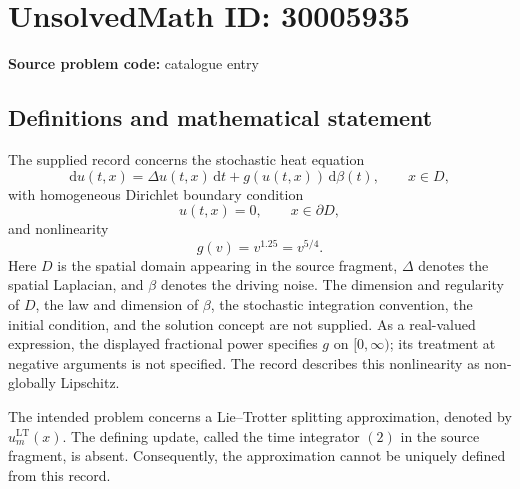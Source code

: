 \documentclass[11pt]{article}
\begin{document}
\section*{UnsolvedMath ID: 30005935}
\textbf{Source problem code:} catalogue entry
\subsection{Definitions and mathematical statement}
The supplied record concerns the stochastic heat equation
\[
\mathrm{d}u(t,x)=\Delta u(t,x)\,\mathrm{d}t+g(u(t,x))\,\mathrm{d}\beta(t),\qquad x\in D,
\]
with homogeneous Dirichlet boundary condition
\[
u(t,x)=0,\qquad x\in\partial D,
\]
and nonlinearity
\[
g(v)=v^{1.25}=v^{5/4}.
\]
Here \(D\) is the spatial domain appearing in the source fragment, \(\Delta\) denotes the spatial Laplacian, and \(\beta\) denotes the driving noise. The dimension and regularity of \(D\), the law and dimension of \(\beta\), the stochastic integration convention, the initial condition, and the solution concept are not supplied. As a real-valued expression, the displayed fractional power specifies \(g\) on \([0,\infty)\); its treatment at negative arguments is not specified. The record describes this nonlinearity as non-globally Lipschitz.

The intended problem concerns a Lie--Trotter splitting approximation, denoted by \(u_m^{\mathrm{LT}}(x)\). The defining update, called the time integrator \((2)\) in the source fragment, is absent. Consequently, the approximation cannot be uniquely defined from this record.
\end{document}

